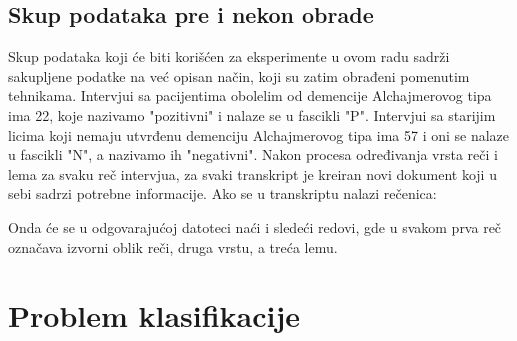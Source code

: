 \documentclass[12pt,oneside]{memoir}
\begin{document}
\section{Skup podataka pre i nekon obrade}

Skup podataka koji će biti korišćen za eksperimente u ovom radu sadrži sakupljene podatke na već opisan način,  koji su zatim obrađeni pomenutim tehnikama.  Intervjui sa pacijentima obolelim od demencije Alchajmerovog tipa ima 22,  koje nazivamo "pozitivni" i nalaze se u fascikli "P".  Intervjui sa starijim licima koji nemaju utvrđenu demenciju Alchajmerovog tipa ima 57 i oni se nalaze u fascikli "N", a nazivamo ih "negativni".  Nakon procesa određivanja vrsta reči i lema za svaku reč intervjua,  za svaki transkript je kreiran novi dokument koji u sebi sadrzi potrebne informacije.  Ako se u transkriptu nalazi rečenica:
\newline

\noindent{}
\newline\newline
Onda će se u odgovarajućoj datoteci naći i sledeći redovi, gde u svakom prva reč označava izvorni oblik reči, druga vrstu, a treća lemu. 
\newline

\noindent{}

\chapter{Problem klasifikacije}
\end{document}
